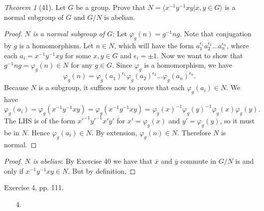 \documentclass[12pt]{article}
\theoremstyle{remark}
\theoremstyle{named}
\newtheorem*{theorem}{Theorem}
\renewcommand{\bar}{\overline}
\begin{document}
\begin{theorem}[41]
    Let \(G\) be a group. Prove that \(N = \langle x^{-1}y^{-1}xy | x, y \in G \rangle\) is a normal subgroup of \(G\) and \(G/N\) is abelian. 
\end{theorem}

\begin{proof}
    \textit{\(N\) is a normal subgroup of \(G\)}: Let \(\varphi_g(n) = g^{-1}ng\). Note that conjugation by \(g\) is a homomorphism. Let \(n \in N\), which will have the form \(a_1^{\epsilon_1} a_2^{\epsilon_2} \dots a_n^{\epsilon_n}\), where each \(a_i = x^{-1}y^{-1}xy\) for some \(x, y \in G\) and \(\epsilon_i = \pm 1\). Now we want to show that \(g^{-1}ng = \varphi_g(n) \in N\) for any \(g \in G\). Since \(\varphi_g\) is a homomorphism, we have 
    \[\varphi_g(n) = \varphi_g(a_1)^{\epsilon_1} \varphi_g(a_2)^{\epsilon_2} \dots \varphi_g(a_n)^{\epsilon_n}.\]
    Because \(N\) is a subgroup, it suffices now to prove that each \(\varphi_g(a_i) \in N\). We have \[\varphi_g(a_i) = \varphi_g(x^{-1}y^{-1}xy) = \varphi_g(x^{-1}y^{-1}xy) = \varphi_g(x)^{-1}\varphi_g(y)^{-1}\varphi_g(x)\varphi_g(y).\]
    The LHS is of the form \(x'^{-1}y'^{-1}x'y'\) for \(x' = \varphi_g(x)\) and \(y' = \varphi_g(y)\), so it must be in \(N\). Hence \(\varphi_g(a_i) \in N\). By extension, \(\varphi_g(n) \in N\). Therefore \(N\) is normal.
\end{proof}

\begin{proof}
    \textit{\(N\) is abelian}: By Exercise 40 we have that \(\bar x\) and \(\bar y\) commute in \(G/N\) is and only if \(x^{-1}y^{-1}xy \in N\). But by definition, 
\end{proof}

Exercise 4, pp. 111.

\begin{enumerate}
    \item [4.] 
\end{enumerate}
\end{document}
